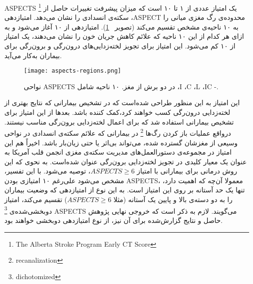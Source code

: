 ASPECTS 
\footnote{The Alberta Stroke Program Early CT Score}
یک امتیاز عددی از ۱ تا ۱۰ است که میزان پیشرفت تغییرات حاصل از سکته‌ی انسدادی را 
نشان می‌دهد.
 امتیاز‌دهی ،ASPECT 
 محدوده‌ی رگ مغزی میانی را به ۱۰ ناحیه‌ی مشخص تقسیم می‌کند (تصویر ~\ref{fig:aspects-regions}).
 امتیازدهی  از ۱۰ آغاز می‌شود و به ازای هر کدام از این ۱۰ ناحیه که علائم کاهش جریان 
 خون را نشان می‌دهند، یک امتیاز از ۱۰ کم می‌شود.
 این امتیاز برای تجویز لخته‌زدایی‌های درون‌رگی و برون‌رگی برای بیماران به‌کار می‌آید.

\begin{figure}[ht]
\centering
\texttt{[image: aspects-regions.png]}
\caption[]{نواحی ASPECTS در دو برش از مغز. ۱۰ ناحیه شامل ،I ،C ،L ،IC -.}
\label{fig:aspects-regions}
\end{figure}

این امتیاز 
به این منظور طراحی شده‌است که 
در تشخیص بیمارانی که نتایج بهتری از لخته‌زدایی درون‌رگی
کسب خواهند کرد،‌کمک کننده باشد.
بعد‌ها از این امتیاز برای تشخیص بیمارانی استفاده شد که برای اعمال لخته‌زدایی برون‌رگی مناسب نیستند.
درواقع عملیات باز کردن رگ‌ها 
\footnote{recanalization}
در بیمارانی که علائم سکته‌ی انسدادی در نواحی وسیعی از مغزشان گسترده شده، می‌تواند بی‌اثر یا حتی زیان‌بار باشد.
اخیراً هم این امتیاز در
مجموعه‌ی دستور‌العمل‌های مدیریت سکته‌ی مغزی
انجمن قلب آمریکا به عنوان 
 یک معیار کلیدی در تجویز 
 لخته‌زدایی برون‌رگی عنوان شده‌است.
 به نحوی که این روش درمانی برای بیمارانی با امتیاز $ASPECTS\geq 6$، توصیه می‌شود.
با این تفسیر، مشخص می‌شود علی‌رغم ۱۰ امتیازی بودن ASPECTS، معمولا آن‌چه که اهمیت دارد، تنها یک حد آستانه بر روی این امتیاز است.
به این نوع از امتیازدهی که وضعیت بیماران را به دو دسته‌ی بالا و پایین یک آستانه (مثلا $ASPECTS\geq6$) تقسیم می‌کند، امتیاز دوبخشی‌شده‌ی
\footnote{dichotomized}
ASPECTS می‌گویند.
لازم به ذکر است که خروجی نهایی پژوهش حاصل و نتایج گزارش‌شده برای آن نیز، از نوع امتیازدهی دو‌بخشی خواهند بود.


